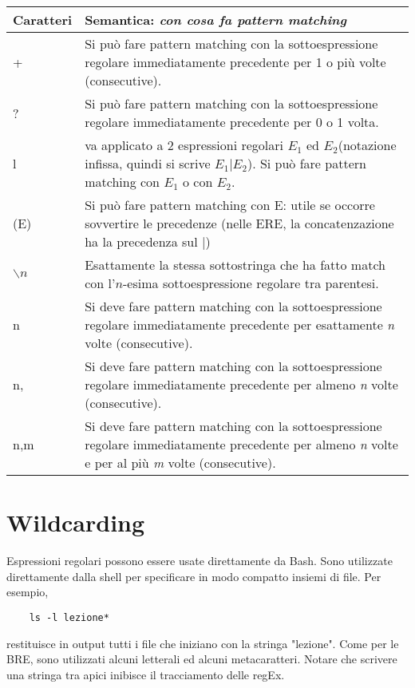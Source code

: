 \begin{center}
	 \label{tab:table-ere}
	\begin{tabular}{|l|p{10cm}|}
	\hline
        \textbf{Caratteri} & \textbf{Semantica: \textit{con cosa fa pattern matching}} \\ \hline
		+		& Si può fare pattern matching con la sottoespressione regolare immediatamente precedente per 1 o più volte (consecutive). \\ \hline
		?		& Si può fare pattern matching con la sottoespressione regolare immediatamente precedente per 0 o 1 volta. \\ \hline
		l & va applicato a 2 espressioni regolari $ E_{1} $ ed $ E_{2} $(notazione infissa, quindi si scrive $ E_{1}|E_{2} $). Si può fare pattern matching con $ E_{1} $ o con $ E_{2} $. \\ \hline
		(E)		& Si può fare pattern matching con E: utile se occorre sovvertire le precedenze (nelle ERE, la concatenzazione ha la precedenza sul |) \\ \hline
		$ \backslash n $		& Esattamente la stessa sottostringa che ha fatto match con l'$ n $-esima sottoespressione regolare tra parentesi. \\ \hline
		{n}		& Si deve fare pattern matching con la sottoespressione regolare immediatamente precedente per esattamente \textit{n} volte (consecutive). \\ \hline
		{n,}		& Si deve fare pattern matching con la sottoespressione regolare immediatamente precedente per almeno \textit{n} volte (consecutive). \\ \hline
		{n,m}		& Si deve fare pattern matching con la sottoespressione regolare immediatamente precedente per almeno \textit{n} volte e per al più \textit{m} volte (consecutive). \\ \hline
	\end{tabular}		
\end{center}
\newpage

\section{Wildcarding}
Espressioni regolari possono essere usate direttamente da Bash. Sono utilizzate direttamente dalla shell per specificare in modo compatto insiemi di file. Per esempio,
\begin{lstlisting}
	ls -l lezione*
\end{lstlisting}
restituisce in output tutti i file che iniziano con la stringa "lezione".
Come per le BRE, sono utilizzati alcuni letterali ed alcuni metacaratteri.
Notare che scrivere una stringa tra apici inibisce il tracciamento delle regEx.

